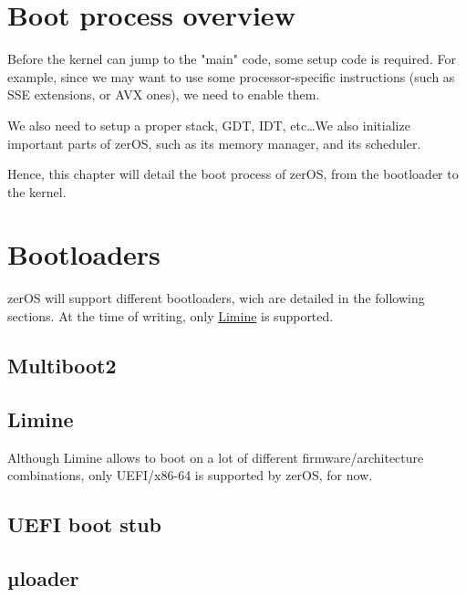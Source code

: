 \section[Overview]{Boot process overview}

Before the kernel can jump to the "main" code, some setup code is required. For example, since we may want to use some processor-specific instructions (such as SSE extensions, or AVX ones), we need to enable them.

We also need to setup a proper stack, GDT, IDT, etc\dots We also initialize important parts of zerOS, such as its memory manager, and its scheduler.

Hence, this chapter will detail the boot process of zerOS, from the bootloader to the kernel.

\section{Bootloaders}

zerOS will support different bootloaders, wich are detailed in the following sections. At the time of writing, only \hyperref[sec:limine]{Limine} is supported.

\subsection{Multiboot2}


\subsection{Limine}

\label{sec:limine}

Although Limine allows to boot on a lot of different firmware/architecture combinations, only UEFI/x86-64 is supported by zerOS, for now.


\subsection{UEFI boot stub}


\subsection{µloader}

